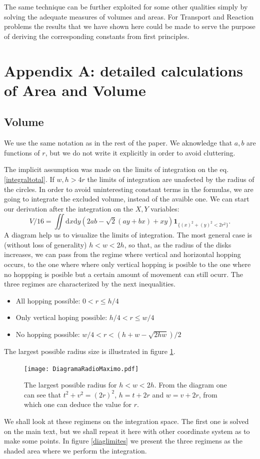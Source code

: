 \documentclass[letterpaper,10pt, jcp, aps]{revtex4-1}
\newcommand{\rd}{\!\mathrm{d}}
\newcommand{\indicator}[1]{\mathbf{1}_{ \{   #1 \} } }
\begin{document}
The same technique can be further exploited for some other
qualities simply by solving the adequate measures
of volumes and areas. For Transport and Reaction problems
the results that we have shown here could be made to serve
the purpose of deriving the corresponding constants from first
principles.


\section{Appendix A: detailed calculations of Area and Volume}

\subsection{Volume}\label{VolApen}

We use the same notation as in the rest of the paper.
We aknowledge that $a,b$ are functions of $r$, but we do not write
it explicitly in order to avoid cluttering.

The implicit assumption was made on the limits of integration on
the eq. \ref{integraltotal}. If $w,h>4r$ the limits of integration
are unafected by the radius of the circles.
In order to avoid uninteresting constant terms
in the formulas, we are going to integrate
the excluded volume, instead of the avaible one. We can start
our derivation after the integration on the $X,Y$ variables:
\begin{equation}\label{VolumenGeneral}
V/16 =\iint \rd x \rd y (2ab-\sqrt{2}(ay+bx)+x y)
\indicator{(x)^2+(y)^2<2r^2 }.
\end{equation}
A diagram help us to visualize the limits of integration. The most general
case is (without loss of generality) $h<w<2h$, so that, as the radius of the
disks increases, we can pass from the regime where vertical and horizontal
hopping occurs, to the one where where only vertical hopping
is posible to the one where no hoppping is posible but a certain amount of movement
can still ocurr. The three regimes are characterized by the next inequalities.
\begin{itemize}
\item All hopping possible: $0<r \leq h/4$
\item Only vertical hoping possible: $h/4< r \leq w/4$
\item No hopping possible: $w/4<r<(h+w-\sqrt{2hw})/2$
\end{itemize}
The largest possible radius size  is illustrated in figure \ref{radiomaximo}.
\begin{figure}[h]
  \centering
  \texttt{[image: DiagramaRadioMaximo.pdf]}
  \caption{The largest possible radius for $h<w<2h$. From the diagram
    one can see that $t^2+v^2=(2r)^2$, $h=t+2r$ and $w=v+2r$, from which
    one can deduce the value for $r$.}
  \label{radiomaximo}
\end{figure}
We shall look at these regimens on the integration space. The first one is solved
on the main text, but we shall repeat it here with other coordinate system as to
make some points. In figure \ref{diaglimites} we present the three regimens as
the shaded area where we perform the integration. 
  
\end{document}

